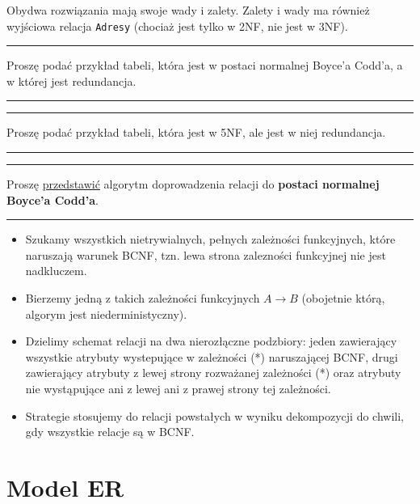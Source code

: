 \documentclass[a5paper,6pt]{article}
\newcommand{\horrule}[1]{\rule{\linewidth}{#1}}
\begin{document}
    Obydwa rozwiązania mają swoje wady i zalety. Zalety i wady ma również
    wyjściowa relacja \texttt{Adresy} (chociaż jest tylko w 2NF, nie jest w
    3NF).

\pagebreak

    \horrule{0.5pt}
    Proszę podać przykład tabeli, która jest w postaci normalnej Boyce’a Codd’a,
    a w której jest redundancja.\\
    \horrule{0.5pt}

\pagebreak

    \horrule{0.5pt}
    Proszę podać przykład tabeli, która jest w 5NF, ale jest w niej
    redundancja.\\
    \horrule{0.5pt}

\pagebreak

    \horrule{0.5pt}
    Proszę \underline{przedstawić} algorytm doprowadzenia relacji do
    \textbf{postaci normalnej Boyce’a Codd’a}.\\
    \horrule{0.5pt}

    \begin{itemize}
        \item Szukamy wszystkich nietrywialnych, pełnych zależności funkcyjnych,
              które naruszają warunek BCNF, tzn. lewa strona zalezności
              funkcyjnej nie jest nadkluczem.
        \item Bierzemy jedną z takich zależności funkcyjnych $A \rightarrow B$
              (obojetnie którą, algorym jest niederministyczny).
        \item Dzielimy schemat relacji na dwa nierozłączne podzbiory:
              jeden zawierający wszystkie atrybuty wystepujące w zależności (*)
              naruszającej BCNF,
              drugi zawierający atrybuty z lewej strony rozważanej zależności
              (*) oraz atrybuty nie wystąpujące ani z lewej ani z prawej strony
              tej zależności.
        \item Strategie stosujemy do relacji powstałych w wyniku dekompozycji
              do chwili, gdy wszystkie relacje są w BCNF.
    \end{itemize}


\pagebreak

    \section{Model ER} %
    \label{sec:model_er}
\end{document}
